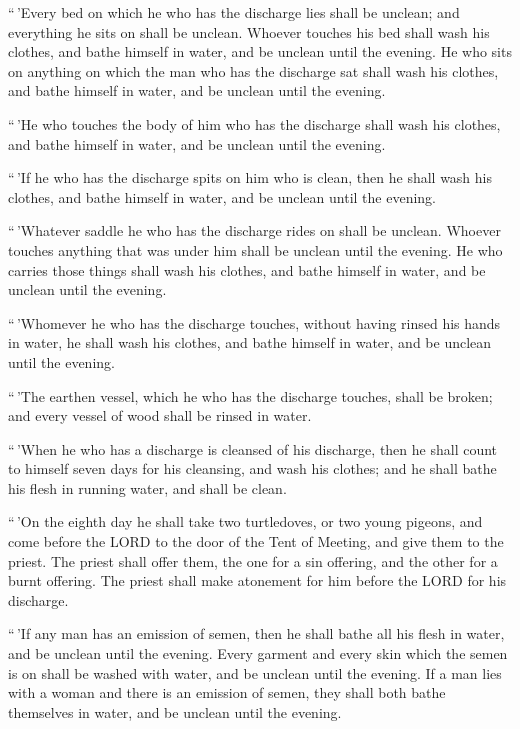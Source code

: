  ``\,'Every bed on which he who has the discharge lies
shall be unclean; and everything he sits on shall be unclean.
 Whoever touches his bed shall wash his clothes, and bathe
himself in water, and be unclean until the evening.  He
who sits on anything on which the man who has the discharge sat shall
wash his clothes, and bathe himself in water, and be unclean until the
evening.

 ``\,'He who touches the body of him who has the discharge
shall wash his clothes, and bathe himself in water, and be unclean until
the evening.

 ``\,'If he who has the discharge spits on him who is
clean, then he shall wash his clothes, and bathe himself in water, and
be unclean until the evening.

 ``\,'Whatever saddle he who has the discharge rides on
shall be unclean.  Whoever touches anything that was
under him shall be unclean until the evening. He who carries those
things shall wash his clothes, and bathe himself in water, and be
unclean until the evening.

 ``\,'Whomever he who has the discharge touches, without
having rinsed his hands in water, he shall wash his clothes, and bathe
himself in water, and be unclean until the evening.

 ``\,'The earthen vessel, which he who has the discharge
touches, shall be broken; and every vessel of wood shall be rinsed in
water.

 ``\,'When he who has a discharge is cleansed of his
discharge, then he shall count to himself seven days for his cleansing,
and wash his clothes; and he shall bathe his flesh in running water, and
shall be clean.

 ``\,'On the eighth day he shall take two turtledoves, or
two young pigeons, and come before the LORD to the door of the Tent of
Meeting, and give them to the priest.  The priest shall
offer them, the one for a sin offering, and the other for a burnt
offering. The priest shall make atonement for him before the LORD for
his discharge.

 ``\,'If any man has an emission of semen, then he shall
bathe all his flesh in water, and be unclean until the evening.
 Every garment and every skin which the semen is on shall
be washed with water, and be unclean until the evening. 
If a man lies with a woman and there is an emission of semen, they shall
both bathe themselves in water, and be unclean until the evening.

